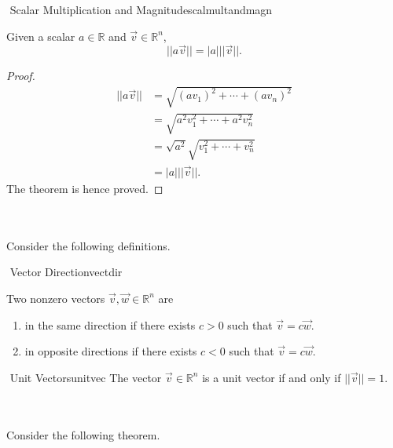     \begin{theorem}{\Stop\,\,Scalar Multiplication and Magnitude}{scalmultandmagn}

        Given a scalar \(a\in\mathbb{R}\) and \(\vec{v}\in\mathbb{R}^n\), 
        \begin{equation*}
            ||a\vec{v}||=|a|||\vec{v}||.
        \end{equation*}
        \begin{proof}
        \begin{align*}
            ||a\vec{v}||&=\sqrt{(av_1)^2+\cdots+(av_n)^2} \\
            &=\sqrt{a^2v_1^2+\cdots+a^2v_n^2} \\
            &=\sqrt{a^2}\sqrt{v_1^2+\cdots+v_n^2} \\
            &=|a|||\vec{v}||.
        \end{align*}    
        The theorem is hence proved.
        \end{proof}
            
    \end{theorem}
    \pagebreak
    \vphantom
    \\
    \\
    Consider the following definitions.
    \begin{definition}{\Stop\,\,Vector Direction}{vectdir}

        Two nonzero vectors \(\vec{v},\vec{w}\in\mathbb{R}^n\) are
        \begin{enumerate}
            \item in the same direction if there exists \(c>0\) such that \(\vec{v}=c\vec{w}\).
            \item in opposite directions if there exists \(c<0\) such that \(\vec{v}=c\vec{w}\).
        \end{enumerate}
        
    \end{definition}
    \begin{definition}{\Stop\,\,Unit Vectors}{unitvec}
        The vector \(\vec{v}\in\mathbb{R}^n\) is a unit vector if and only if \(||\vec{v}||=1\).
    \end{definition}
    \vphantom
    \\
    \\
    Consider the following theorem.
